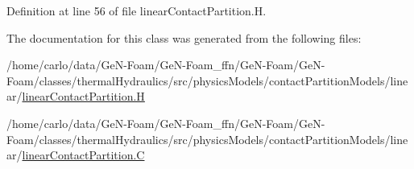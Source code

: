 Definition at line 56 of file linear\+Contact\+Partition.\+H.



The documentation for this class was generated from the following files\+:\begin{DoxyCompactItemize}
\item 
/home/carlo/data/\+Ge\+N-\/\+Foam/\+Ge\+N-\/\+Foam\+\_\+ffn/\+Ge\+N-\/\+Foam/\+Ge\+N-\/\+Foam/classes/thermal\+Hydraulics/src/physics\+Models/contact\+Partition\+Models/linear/\hyperlink{linearContactPartition_8H}{linear\+Contact\+Partition.\+H}\item 
/home/carlo/data/\+Ge\+N-\/\+Foam/\+Ge\+N-\/\+Foam\+\_\+ffn/\+Ge\+N-\/\+Foam/\+Ge\+N-\/\+Foam/classes/thermal\+Hydraulics/src/physics\+Models/contact\+Partition\+Models/linear/\hyperlink{linearContactPartition_8C}{linear\+Contact\+Partition.\+C}\end{DoxyCompactItemize}
